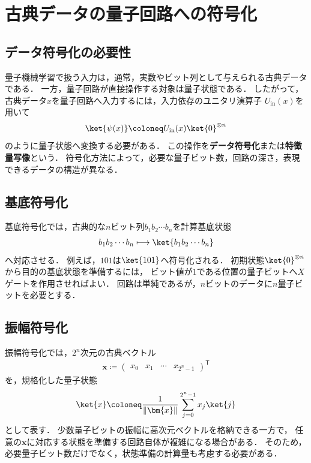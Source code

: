 \section{古典データの量子回路への符号化}
\label{sec:data-encoding}

\subsection{データ符号化の必要性}
\label{subsec:need-for-encoding}

量子機械学習で扱う入力は，通常，実数やビット列として与えられる古典データである．
一方，量子回路が直接操作する対象は量子状態である．
したがって，古典データ$x$を量子回路へ入力するには，入力依存のユニタリ演算子
$U_{\mathrm{in}}(x)$を用いて
\begin{equation}
  \ket{\psi(x)}
  \coloneq
  U_{\mathrm{in}}(x)\ket{0}^{\otimes n}
  \label{eq:input-encoding}
\end{equation}
のように量子状態へ変換する必要がある．
この操作を\textbf{データ符号化}または\textbf{特徴量写像}という．
符号化方法によって，必要な量子ビット数，回路の深さ，表現できるデータの構造が異なる．

\subsection{基底符号化}
\label{subsec:basis-encoding}

基底符号化では，古典的な$n$ビット列$b_1b_2\cdots b_n$を計算基底状態
\begin{align*}
  b_1b_2\cdots b_n
  \longmapsto
  \ket{b_1b_2\cdots b_n}
\end{align*}
へ対応させる．
例えば，$101$は$\ket{101}$へ符号化される．
初期状態$\ket{0}^{\otimes n}$から目的の基底状態を準備するには，
ビット値が$1$である位置の量子ビットへ$X$ゲートを作用させればよい．
回路は単純であるが，$n$ビットのデータに$n$量子ビットを必要とする．

\subsection{振幅符号化}
\label{subsec:amplitude-encoding}

振幅符号化では，$2^n$次元の古典ベクトル
\begin{align*}
  \bm{x}
  \coloneq
  \begin{pmatrix}
    x_0 & x_1 & \cdots & x_{2^n-1}
  \end{pmatrix}^{\mathsf{T}}
\end{align*}
を，規格化した量子状態
\begin{equation}
  \ket{x}
  \coloneq
  \frac{1}{\|\bm{x}\|}
  \sum_{j=0}^{2^n-1}x_j\ket{j}
  \label{eq:amplitude-encoding}
\end{equation}
として表す．
少数量子ビットの振幅に高次元ベクトルを格納できる一方で，
任意の$\bm{x}$に対応する状態を準備する回路自体が複雑になる場合がある．
そのため，必要量子ビット数だけでなく，状態準備の計算量も考慮する必要がある．
